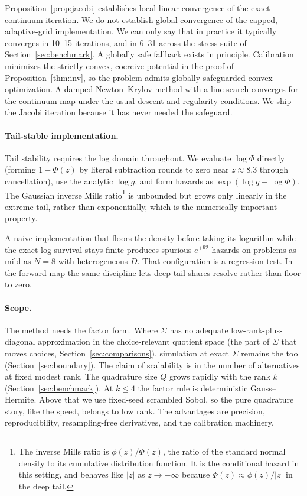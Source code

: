\documentclass[12pt]{article}
\theoremstyle{remark}
\begin{document}
Proposition~\ref{prop:jacobi} establishes local linear convergence of
the exact continuum iteration. We do not establish global convergence
of the capped, adaptive-grid implementation. We can only
say that in practice it typically converges in 10--15 iterations, and in 6--31 across the stress suite of
Section~\ref{sec:benchmark}. A globally safe fallback exists in
principle. Calibration minimizes the strictly convex, coercive
potential in the proof of Proposition~\ref{thm:inv}, so the problem
admits globally safeguarded convex optimization. A damped
Newton--Krylov method with a line search converges for the continuum
map under the usual descent and regularity conditions. We ship the
Jacobi iteration because it has never needed the safeguard.

\paragraph{Tail-stable implementation.} Tail stability requires the log
domain throughout. We evaluate $\log \Phi$ directly (forming $1 - \Phi(z)$
by literal subtraction rounds to zero near $z \approx 8.3$ through
cancellation), use the analytic $\log g$, and form hazards as
$\exp(\log g - \log \Phi)$. The Gaussian inverse Mills ratio\footnote{The
inverse Mills ratio is $\phi(z)/\Phi(z)$, the ratio of the standard
normal density to its cumulative distribution function. It is the
conditional hazard in this setting, and behaves like $|z|$ as $z \to
-\infty$ because $\Phi(z) \approx \phi(z)/|z|$ in the deep tail.} is
unbounded but grows only linearly in the extreme tail, rather than
exponentially, which is the numerically important property.

A naive implementation that floors the density before taking its
logarithm while the exact log-survival stays finite produces spurious $e^{+92}$ hazards on problems as
mild as $N = 8$ with heterogeneous $D$.  That configuration is a regression
test. In the forward map the same discipline lets deep-tail shares resolve
rather than floor to zero. 

\paragraph{Scope.} The method needs the factor form. Where $\Sigma$ has no
adequate low-rank-plus-diagonal approximation in the choice-relevant
quotient space (the part of $\Sigma$ that moves choices,
Section~\ref{sec:comparisons}), simulation at exact $\Sigma$ remains the tool
(Section~\ref{sec:boundary}). The claim of scalability is in the
number of alternatives at fixed modest rank. The quadrature size $Q$
grows rapidly with the rank $k$ (Section~\ref{sec:benchmark}). At $k
\le 4$ the factor rule is deterministic Gauss--Hermite. Above that we
use fixed-seed scrambled Sobol, so the pure quadrature story, like the
speed, belongs to low rank. The
advantages are precision,
reproducibility, resampling-free derivatives, and the calibration
machinery.
\end{document}
